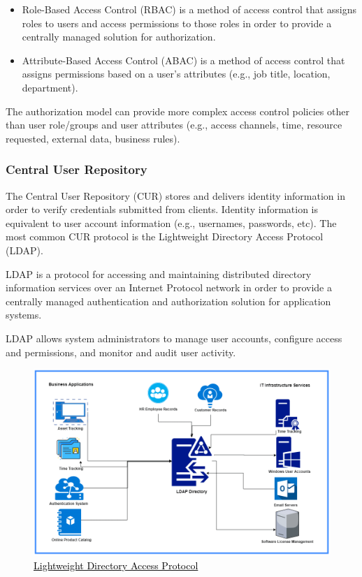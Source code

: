 \begin{itemize}
    \item Role-Based Access Control (RBAC) is a method of access control that assigns roles to users  and access permissions to those roles in order to provide a centrally managed solution for authorization. 
    \item Attribute-Based Access Control (ABAC) is a method of access control that assigns permissions based on a user's attributes (e.g., job title, location, department). 
\end{itemize}

The authorization model can provide more complex access control policies other than user role/groups and user attributes (e.g., access channels, time, resource requested, external data, business rules). 

\subsubsection{Central User Repository}
The Central User Repository (CUR) stores and delivers identity information in order to verify credentials submitted from clients. Identity information is equivalent to user account information (e.g., usernames, passwords, etc). The most common CUR protocol is the Lightweight Directory Access Protocol (LDAP). 

LDAP is a protocol for accessing and maintaining distributed directory information services over an Internet Protocol network in order to provide a centrally managed authentication and authorization solution for application systems. 

LDAP allows system administrators to manage user accounts, configure access and permissions, and monitor and audit user activity.

\begin{figure}[H]
    \centering
    \includegraphics[scale = 0.6]{images/LDAP.png}
    \caption{\href{https://doubleoctopus.com/security-wiki/protocol/lightweight-directory-access-protocol/}{\textcolor{black}{Lightweight Directory Access Protocol}}}
    \label{LDAP}
\end{figure}

